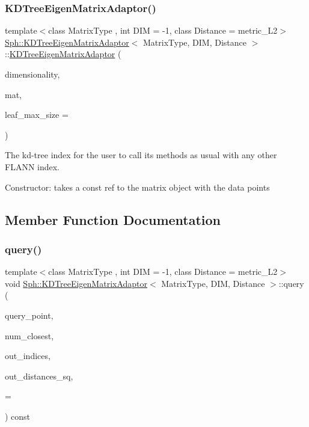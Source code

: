\subsubsection{\texorpdfstring{K\+D\+Tree\+Eigen\+Matrix\+Adaptor()}{KDTreeEigenMatrixAdaptor()}}
{\footnotesize\ttfamily template$<$class Matrix\+Type , int D\+IM = -\/1, class Distance  = metric\+\_\+\+L2$>$ \\
\hyperlink{structSph_1_1KDTreeEigenMatrixAdaptor}{Sph\+::\+K\+D\+Tree\+Eigen\+Matrix\+Adaptor}$<$ Matrix\+Type, D\+IM, Distance $>$\+::\hyperlink{structSph_1_1KDTreeEigenMatrixAdaptor}{K\+D\+Tree\+Eigen\+Matrix\+Adaptor} (\begin{DoxyParamCaption}\item[{const int}]{dimensionality,  }\item[{const Matrix\+Type \&}]{mat,  }\item[{const int}]{leaf\+\_\+max\+\_\+size = {} }\end{DoxyParamCaption})\hspace{0.3cm}{\ttfamily [inline]}}



The kd-\/tree index for the user to call its methods as usual with any other F\+L\+A\+NN index. 

Constructor\+: takes a const ref to the matrix object with the data points 

\subsection{Member Function Documentation}
\hypertarget{structSph_1_1KDTreeEigenMatrixAdaptor_ae1335fbcb8f1189326409a1d582c6cb5}{}\label{structSph_1_1KDTreeEigenMatrixAdaptor_ae1335fbcb8f1189326409a1d582c6cb5} 
\subsubsection{\texorpdfstring{query()}{query()}}
{\footnotesize\ttfamily template$<$class Matrix\+Type , int D\+IM = -\/1, class Distance  = metric\+\_\+\+L2$>$ \\
void \hyperlink{structSph_1_1KDTreeEigenMatrixAdaptor}{Sph\+::\+K\+D\+Tree\+Eigen\+Matrix\+Adaptor}$<$ Matrix\+Type, D\+IM, Distance $>$\+::query (\begin{DoxyParamCaption}\item[{const num\+\_\+t $\ast$}]{query\+\_\+point,  }\item[{const size\+\_\+t}]{num\+\_\+closest,  }\item[{Index\+Type $\ast$}]{out\+\_\+indices,  }\item[{num\+\_\+t $\ast$}]{out\+\_\+distances\+\_\+sq,  }\item[{const int}]{ = {} }\end{DoxyParamCaption}) const\hspace{0.3cm}{\ttfamily [inline]}}

